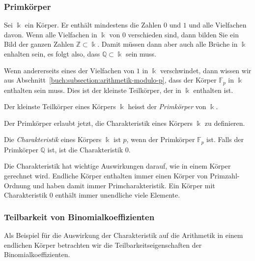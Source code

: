 \subsubsection{Primkörper}
Sei $\Bbbk$ ein Körper.
Er enthält mindestens die Zahlen $0$ und $1$ und alle Vielfachen davon.
Wenn alle Vielfachen in $\Bbbk$ von $0$ verschieden sind, dann
bilden Sie ein Bild der ganzen Zahlen $\mathbb{Z}\subset\Bbbk$.
Damit müssen dann aber auch alle Brüche in $\Bbbk$ enhalten sein,
es folgt also, dass $\mathbb{Q}\subset\Bbbk$ sein muss.

Wenn andererseits eines der Vielfachen von $1$ in $\Bbbk$ 
verschwindet, dann wissen wir aus
Abschnitt~\ref{buch:subsection:arithmetik-modulo-p}, dass
der Körper $\mathbb{F}_p$ in $\Bbbk$ enthalten sein muss.
Dies ist der kleinste Teilkörper, der in $\Bbbk$ enthalten ist.

\begin{definition}
Der kleinste Teilkörper eines Körpers $\Bbbk$ heisst der 
{\em Primkörper} von $\Bbbk$.
\end{definition}

Der Primkörper erlaubt jetzt, die Charakteristik eines Körpers $\Bbbk$
zu definieren.

\begin{definition}
%
Die {\em Charakteristik} eines Körpers $\Bbbk$ ist $p$, wenn der Primkörper
$\mathbb{F}_p$ ist.
Falls der Primkörper $\mathbb{Q}$ ist, ist die Charakteristik $0$.
\end{definition}

Die Charakteristik hat wichtige Auswirkungen darauf, wie in einem Körper
gerechnet wird.
Endliche Körper enthalten immer einen Körper von Primzahl-Ordnung und
haben damit immer Primcharakteristik.
Ein Körper mit Charakteristik $0$ enthält immer unendliche viele
Elemente.

\subsubsection{Teilbarkeit von Binomialkoeffizienten}
Als Beispiel für die Auswirkung der Charakteristik auf die Arithmetik
in einem endlichen Körper betrachten wir die Teilbarkeitseigenschaften
der Binomialkoeffizienten.

